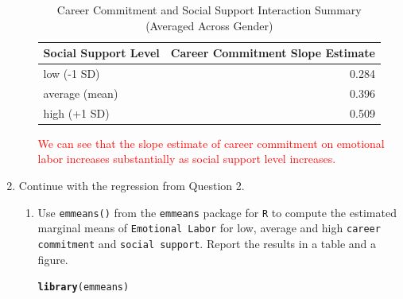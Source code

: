 \documentclass{article}\usepackage[]{graphicx}\usepackage[]{xcolor}
\makeatletter
\newcommand{\hldef}[1]{\textcolor[rgb]{0.345,0.345,0.345}{#1}}%
\newcommand{\hlkwd}[1]{\textcolor[rgb]{0.737,0.353,0.396}{\textbf{#1}}}%
\newenvironment{kframe}{%
 \def\at@end@of@kframe{}%
 \ifinner\ifhmode%
  \def\at@end@of@kframe{\end{minipage}}%
  \begin{minipage}{\columnwidth}%
 \fi\fi%
 \def\FrameCommand##1{\hskip\@totalleftmargin \hskip-\fboxsep
 \colorbox{shadecolor}{##1}\hskip-\fboxsep
     \hskip-\linewidth \hskip-\@totalleftmargin \hskip\columnwidth}%
 \MakeFramed {\advance\hsize-\width
   \@totalleftmargin\z@ \linewidth\hsize
   \@setminipage}}%
 {\par\unskip\endMakeFramed%
 \at@end@of@kframe}
\newenvironment{knitrout}{}{} %
\makeatother
\begin{document}
\begin{enumerate}
\begin{enumerate}
    
\begin{table}[H]
\centering
\begingroup\normalsize
\begin{tabular}{lr}
  \hline
Social Support Level & Career Commitment Slope  Estimate \\ 
  \hline
low (-1 SD) & 0.284 \\ 
  average (mean) & 0.396 \\ 
  high (+1 SD) & 0.509 \\ 
   \hline
\end{tabular}
\endgroup
\caption{Career Commitment and Social Support Interaction Summary (Averaged Across Gender)} 
\label{interaction.tab}
\end{table}

    
    
    \textcolor{red}{We can see that the slope estimate of career commitment on emotional labor increases substantially as social support level increases.}
    
  \end{enumerate}
  \item Continue with the regression from Question 2.
  \begin{enumerate}
    \item Use \texttt{emmeans()} from the \texttt{emmeans} package
    for \texttt{R} \citep{emmeans} to compute the estimated marginal means of
    \texttt{Emotional Labor} for low, average and high \texttt{career commitment}
    and \texttt{social support}. Report the results in a table and a figure.
    
    
\begin{knitrout}\scriptsize
{}\color{fgcolor}\begin{kframe}
\begin{alltt}
\hlkwd{library}\hldef{(emmeans)}


\end{alltt}
\end{kframe}
\end{knitrout}
\end{enumerate}
\end{enumerate}
\end{document}
